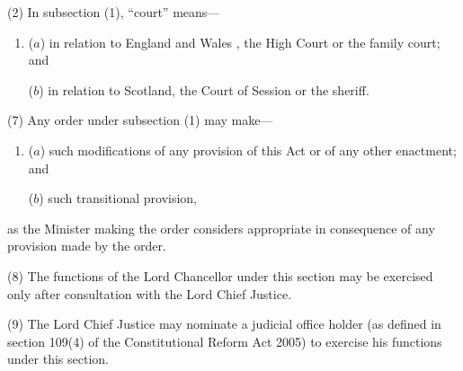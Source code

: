\documentclass[12pt,a4paper]{article}
\begin{document}
(2) In subsection (1), “court” means---
\begin{enumerate}\item[]
($a$) in relation to England and Wales%
, the High Court or the family court; and  %

($b$) in relation to Scotland, the Court of Session or the sheriff.
\end{enumerate}

%
%
%

(7)
Any order under subsection (1) may make---
\begin{enumerate}\item[]
($a$) such modifications of any provision of this Act or of any other enactment; and

($b$) such transitional provision,
\end{enumerate}
as the Minister making the order considers appropriate in consequence of any provision made by the order.

(8) The functions of the Lord Chancellor under this section may be exercised only after consultation with the Lord Chief Justice.

(9) The Lord Chief Justice may nominate a judicial office holder (as defined in section 109(4) of the Constitutional Reform Act 2005) to exercise his functions under this section.
\end{document}
